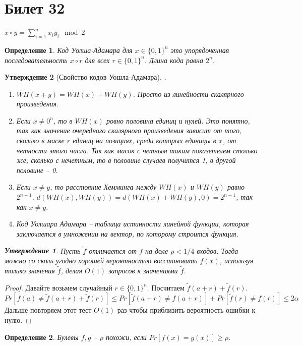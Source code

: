 \documentclass[12pt, letterpaper]{article}
\newtheorem{prop}{Утверждение}[section]
\newtheorem{defi}{Определение}[section]
\begin{document}
\section{Билет 32}
$x \circ y = \sum_{i=1}^n x_i y_i \mod 2$
\begin{defi}
Код Уолша-Адамара для $x \in \{0, 1\}^n$ это упорядоченная последовательность $x \circ r$ для всех $r \in \{0,1\}^n$. Длина кода равна $2^n$.
\end{defi}
\begin{prop}[Свойство кодов Уошла-Адамара].
\begin{enumerate}
\item $WH(x+y) = WH(x) + WH(y)$. Просто из линейности скалярного произведения.
\item Если $x \neq 0^n$, то в $WH(x)$ ровно половина единиц и нулей. Это понятно, так как значение очередного скалярного произведения зависит от того, сколько в маске $r$ единиц на позициях, среди которых единицы в $x$, от четности этого числа. Так как масок с четным таким показетелем столько же, сколько с нечетным, то в половине случаев получится 1, в другой половине -- 0.
\item Если $x \neq y$, то расстояние Хемминга между $WH(x)$ и $WH(y)$ равно $2^{n-1}$. $d(WH(x), WH(y)) = d(WH(x)+WH(y), 0) = 2^{n-1}$, так как $x \neq y$.
\item Код Уолшара Адамара -- таблица истинности линейной функции, которая заключается в умножении на вектор, по которому строится функция.
\end{enumerate}

\begin{prop}
Пусть $\widetilde{f}$ отличается от $f$ на доле $\rho < 1/4$ входов. Тогда можно со сколь угодно хорошей вероятностью восстановить $f(x)$, используя только значения $\widetilde{f}$, делая $O(1)$ запросов к значениями $\widetilde{f}$.
\end{prop}
\end{prop}
\begin{proof}
Давайте возьмем случайный $r \in \{0,1\}^n$. Посчитаем $\widetilde{f}(a+r)+\widetilde{f}(r)$.
$$ 
Pr[f(a) \neq \widetilde{f}(a+r) + \widetilde{f}(r)] \leq Pr[\widetilde{f}(a+r) \neq f(a+r)] + Pr[\widetilde{f}(r) \neq f(r)] \leq 2\alpha
$$
Дальше повторяем этот тест $O(1)$ раз чтобы приблизить вероятность ошибки к нулю.
\end{proof}

\begin{defi}
Булевы $f, g$ -- $\rho$ похожи, если $Pr[f(x) = g(x)] \geq \rho$. 
\end{defi}
\end{document}
